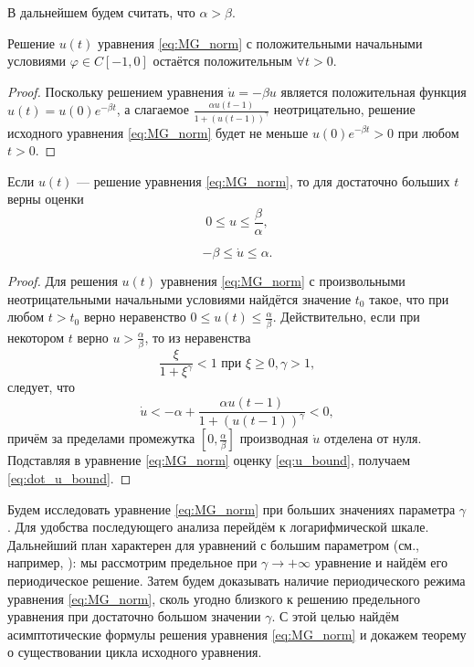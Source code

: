 В дальнейшем будем считать, что $\alpha > \beta$.

\begin{proposition}
Решение $u(t)$ уравнения \eqref{eq:MG_norm} с положительными начальными условиями $\varphi \in C[-1, 0]$ остаётся положительным $\forall t > 0$.
\end{proposition}
\begin{proof}
	Поскольку решением уравнения $\dot{u} = -\beta u$ является положительная функция $u(t) = u(0) e^{-\beta t}$, а слагаемое $\frac{\alpha u(t-1)}{1+(u(t-1))^\gamma}$ неотрицательно, решение исходного уравнения \eqref{eq:MG_norm} будет не меньше $u(0) e^{-\beta t} > 0$ при любом $t > 0$.
\end{proof}

\begin{proposition}
	\label{prop:boundness}
	Если $u(t)$ --- решение уравнения \eqref{eq:MG_norm}, то для достаточно больших $t$ верны оценки
	\begin{equation}
		\label{eq:u_bound}
		0 \leq u \leq \frac{\beta}{\alpha},
	\end{equation}
	
	\begin{equation}
		\label{eq:dot_u_bound}
		-\beta \leq \dot{u} \leq \alpha.
	\end{equation}
\end{proposition}
\begin{proof}
	Для решения $u(t)$ уравнения \eqref{eq:MG_norm} с произвольными неотрицательными начальными условиями найдётся значение $t_0$ такое, что при любом $t > t_0$ верно неравенство $0 \leq u(t) \leq \frac{\alpha}{\beta}$. Действительно, если при некотором $t$ верно $u > \frac{\alpha}{\beta}$, то из неравенства
	\[
	\dfrac{\xi}{1 + \xi^{\gamma}} < 1 \text{ при } \xi \geq 0, \gamma > 1,
	\]
	следует, что
	\[\dot{u} < -\alpha + \frac{\alpha u(t - 1)}{1 + (u(t - 1))^{\gamma}} < 0,\]
	причём за пределами промежутка $[0, \frac{\alpha}{\beta}]$ производная $\dot{u}$ отделена от нуля. Подставляя в уравнение \eqref{eq:MG_norm} оценку \eqref{eq:u_bound}, получаем \eqref{eq:dot_u_bound}.
\end{proof}

Будем исследовать уравнение \eqref{eq:MG_norm} при больших значениях параметра $\gamma$. Для удобства последующего анализа перейдём к логарифмической шкале. Дальнейший план характерен для уравнений с большим параметром (см., например, \cite{Kolesov2010}): мы рассмотрим предельное при $\gamma\to+\infty$ уравнение и найдём его периодическое решение. Затем будем доказывать наличие периодического режима уравнения \eqref{eq:MG_norm}, сколь угодно близкого к решению предельного уравнения при достаточно большом значении $\gamma$. С этой целью найдём асимптотические формулы решения уравнения \eqref{eq:MG_norm} и докажем теорему о существовании цикла исходного уравнения.

